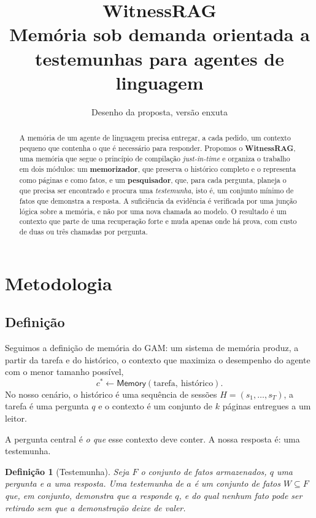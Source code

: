\documentclass[11pt]{article}
\title{\textbf{WitnessRAG}\\[3pt]
\large Memória sob demanda orientada a testemunhas para agentes de linguagem}
\author{}
\date{Desenho da proposta, versão enxuta}
\newtheorem{definicao}{Definição}[section]
\newcommand{\op}[1]{\textsf{#1}}
\begin{document}
\maketitle

\begin{abstract}
A memória de um agente de linguagem precisa entregar, a cada pedido, um
contexto pequeno que contenha o que é necessário para responder. Propomos o
\textbf{WitnessRAG}, uma memória que segue o princípio de compilação
\emph{just-in-time} e organiza o trabalho em dois módulos: um
\textbf{memorizador}, que preserva o histórico completo e o representa como
páginas e como fatos, e um \textbf{pesquisador}, que, para cada pergunta,
planeja o que precisa ser encontrado e procura uma \emph{testemunha}, isto é,
um conjunto mínimo de fatos que demonstra a resposta. A suficiência da
evidência é verificada por uma junção lógica sobre a memória, e não por uma
nova chamada ao modelo. O resultado é um contexto que parte de uma
recuperação forte e muda apenas onde há prova, com custo de duas ou três
chamadas por pergunta.
\end{abstract}

\section{Metodologia}

\subsection{Definição}

Seguimos a definição de memória do GAM: um sistema de memória produz, a
partir da tarefa e do histórico, o contexto que maximiza o desempenho do
agente com o menor tamanho possível,
\[
c^\ast \leftarrow \op{Memory}(\text{tarefa},\ \text{histórico}).
\]
No nosso cenário, o histórico é uma sequência de sessões
$H=(s_1,\dots,s_T)$, a tarefa é uma pergunta $q$ e o contexto é um conjunto de
$k$ páginas entregues a um leitor.

A pergunta central é \emph{o que} esse contexto deve conter. A nossa resposta
é: uma testemunha.

\begin{definicao}[Testemunha]
Seja $F$ o conjunto de fatos armazenados, $q$ uma pergunta e $a$ uma
resposta. Uma \emph{testemunha} de $a$ é um conjunto de fatos
$W\subseteq F$ que, em conjunto, demonstra que $a$ responde $q$, e do qual
nenhum fato pode ser retirado sem que a demonstração deixe de valer.
\end{definicao}
\end{document}
